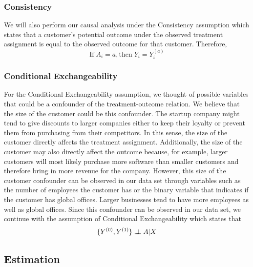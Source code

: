 \documentclass[10pt]{article}
\newcommand{\independent}{\perp\mkern-9.5mu\perp}
\begin{document}
\subsubsection{Consistency}

We will also perform our causal analysis under the Consistency assumption which states that a customer's potential outcome under the observed treatment assignment is equal to the observed outcome for that customer. Therefore,
\[
\text{If} \; A_i = a, \text{then}\; Y_i = Y_i^{(a)}
\]
\subsubsection{Conditional Exchangeability}

For the Conditional Exchangeability assumption, we thought of possible variables that could be a confounder of the treatment-outcome relation. We believe that the size of the customer could be this confounder. The startup company might tend to give discounts to larger companies either to keep their loyalty or prevent them from purchasing from their competitors. In this sense, the size of the customer directly affects the treatment assignment. Additionally, the size of the customer may also directly affect the outcome because, for example, larger customers will most likely purchase more software than smaller customers and therefore bring in more revenue for the company. However, this size of the customer confounder can be observed in our data set through variables such as the number of employees the customer has or the binary variable that indicates if the customer has global offices. Larger businesses tend to have more employees as well as global offices. Since this confounder can be observed in our data set, we continue with the assumption of Conditional Exchangeability which states that
\[
\{Y^{(0)}, Y^{(1)}\} \independent{A|X}
\]
\subsection{Estimation}
\end{document}
